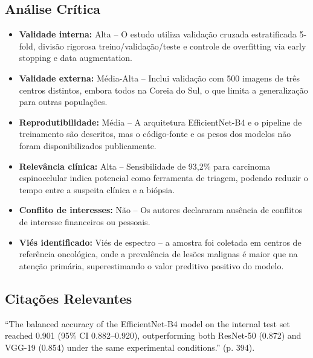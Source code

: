 \subsection{Análise Crítica}
\begin{itemize}
  \item \textbf{Validade interna:} Alta -- O estudo utiliza validação cruzada
        estratificada 5-fold, divisão rigorosa treino/validação/teste e
        controle de overfitting via early stopping e data augmentation.
  \item \textbf{Validade externa:} Média-Alta -- Inclui validação com 500
        imagens de três centros distintos, embora todos na Coreia do Sul,
        o que limita a generalização para outras populações.
  \item \textbf{Reprodutibilidade:} Média -- A arquitetura EfficientNet-B4
        e o pipeline de treinamento são descritos, mas o código-fonte e
        os pesos dos modelos não foram disponibilizados publicamente.
  \item \textbf{Relevância clínica:} Alta -- Sensibilidade de 93,2\% para
        carcinoma espinocelular indica potencial como ferramenta de triagem,
        podendo reduzir o tempo entre a suspeita clínica e a biópsia.
  \item \textbf{Conflito de interesses:} Não -- Os autores declararam
        ausência de conflitos de interesse financeiros ou pessoais.
  \item \textbf{Viés identificado:} Viés de espectro -- a amostra foi
        coletada em centros de referência oncológica, onde a prevalência
        de lesões malignas é maior que na atenção primária, superestimando
        o valor preditivo positivo do modelo.
\end{itemize}

\subsection{Citações Relevantes}
\begin{citacao}
``The balanced accuracy of the EfficientNet-B4 model on the internal test
set reached 0.901 (95\% CI 0.882--0.920), outperforming both ResNet-50
(0.872) and VGG-19 (0.854) under the same experimental conditions.''
(p. 394).
\end{citacao}

